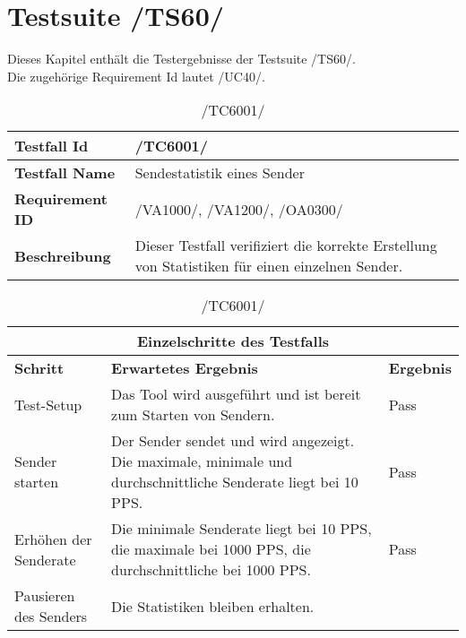 \chapter{Testsuite /TS60/}
Dieses Kapitel enthält die Testergebnisse der Testsuite /TS60/.\\
Die zugehörige Requirement Id lautet /UC40/.

\begin{table}[h]
        \caption{/TC6001/}
        \label{tab:TC6001}
        \begin{center}
            \begin{tabular}{|p{3.5cm}|p{12cm}|}
                \hline
                    \textbf{Testfall Id} & /TC6001/\\
                \hline
                    \textbf{Testfall Name} & Sendestatistik eines Sender\\
                \hline
                    \textbf{Requirement ID} & /VA1000/, /VA1200/, /OA0300/\\
                \hline
                    \textbf{Beschreibung} & Dieser Testfall verifiziert die
                    korrekte Erstellung von Statistiken für einen einzelnen
                    Sender.\\
                \hline
            \end{tabular}
            \begin{tabular}{|p{2.5cm}|p{7.55cm}|p{5cm}|}
                \multicolumn{3}{|c|}{\textbf{Einzelschritte des Testfalls}} \\
                \hline
                    \textbf{Schritt} & \textbf{Erwartetes
                    Ergebnis} & \textbf{Ergebnis}\\
                \hline
                    Test-Setup & Das Tool
                    wird ausgeführt und ist bereit zum Starten von Sendern. &
                    Pass
                    \\
                \hline
                    Sender starten & Der Sender
                    sendet und wird angezeigt. Die maximale, minimale und
                    durchschnittliche Senderate liegt bei 10 PPS. &
                    Pass\\
                \hline
                    Erhöhen der Senderate & Die minimale Senderate
                    liegt bei 10 PPS, die maximale bei 1000 PPS, die
                    durchschnittliche bei 1000 PPS. &
                    Pass\\
                \hline
                    Pausieren des Senders & Die Statistiken bleiben erhalten.

\end{tabular}
\end{center}
\end{table}
